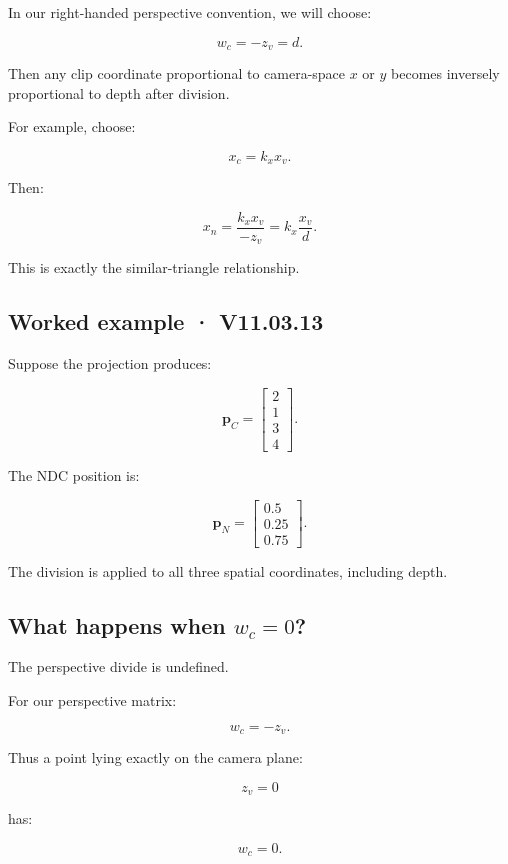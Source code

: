 In our right-handed perspective convention, we will choose:

\[
 \boxed{ w_c=-z_v=d }.
\]

Then any clip coordinate proportional to camera-space \(x\) or \(y\) becomes inversely proportional to depth after division.

For example, choose:

\[
 x_c=k_xx_v.
\]

Then:

\[
 x_n= \frac{k_xx_v}{-z_v} = k_x\frac{x_v}{d}.
\]

This is exactly the similar-triangle relationship.

\subsection{Worked example · V11.03.13}\label{02-foundations-ii-ch033-worked-example-v11.03.13}

Suppose the projection produces:

\[
 \mathbf p_C= \begin{bmatrix} 2\\1\\3\\4 \end{bmatrix}.
\]

The NDC position is:

\[
 \boxed{ \mathbf p_N= \begin{bmatrix} 0.5\\0.25\\0.75 \end{bmatrix} }.
\]

The division is applied to all three spatial coordinates, including depth.

\subsection{\texorpdfstring{What happens when \(w_c=0\)?}{What happens when w\_c=0?}}\label{02-foundations-ii-ch033-what-happens-when-w_c0}

The perspective divide is undefined.

For our perspective matrix:

\[
 w_c=-z_v.
\]

Thus a point lying exactly on the camera plane:

\[
 z_v=0
\]

has:

\[
 w_c=0.
\]

